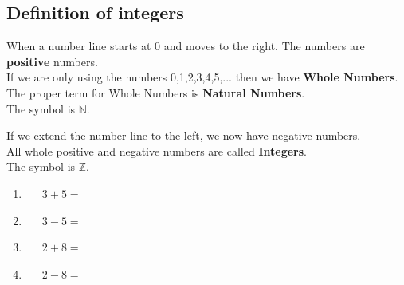 \documentclass[a4paper,12pt]{article}
\begin{document}
\subsection{Definition of integers}
\begin{onehalfspace}
When a number line starts at 0 and moves to the right. The numbers are \textbf{positive} numbers.\\
If we are only using the numbers 0,1,2,3,4,5,... then we have \textbf{Whole Numbers}.\\
The proper term for Whole Numbers is \textbf{Natural Numbers}. \\
The symbol is $\mathbb{N}$. 
\begin{center}
\end{center}
If we extend the number line to the left, we now have negative numbers.\\
All whole positive and negative numbers are called \textbf{Integers}. \\
The symbol is $\mathbb{Z}$.
\begin{center}
\end{center}\vspace{0.5cm}
\begin{tcolorbox}[colback=red!0!white, colframe=gray ,title=\subsubsection{Use a number line (when you need to), to help you work out the following sums.}\label{IntOne}]
\begin{multicols}{3}
	\begin{enumerate}[label=\footnotesize \roman*)]
		\item~~~$3+5=$
		\item~~~$3-5=$
		\item~~~$2+8=$
		\item~~~$2-8=$

\end{enumerate}
\end{multicols}
\end{tcolorbox}
\end{onehalfspace}
\end{document}
